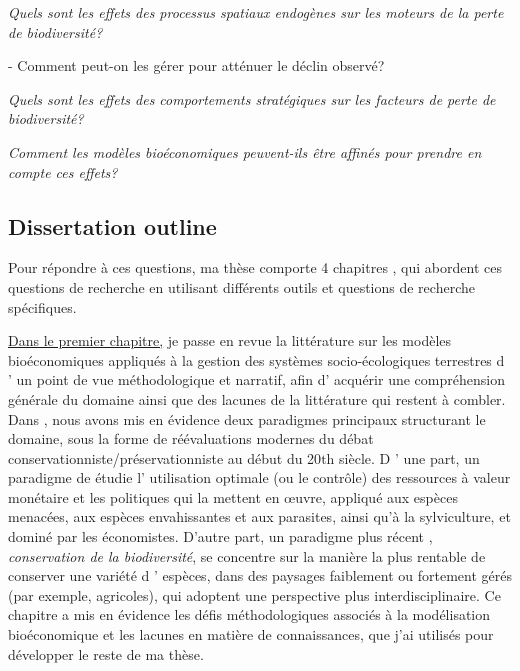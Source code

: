 \begin{displayquote}
\begin{displayquote}
\begin{displayquote}
{{{\begin{displayquote}
\textit{Quels sont les effets des processus spatiaux endogènes sur les moteurs de la perte de biodiversité?}

\N- Comment peut-on les gérer pour atténuer le déclin observé?



  \textit{Quels sont les effets des comportements stratégiques sur les facteurs de perte de biodiversité? }



\textit{Comment les modèles bioéconomiques peuvent-ils être affinés pour prendre en compte ces effets?}
\end{displayquote}

{}
\subsection*{Dissertation outline}


 
Pour répondre à ces questions, ma thèse comporte 4 chapitres , qui abordent ces questions de recherche en utilisant différents outils et questions de recherche spécifiques. 





\hyperref[chapter1]{Dans le premier chapitre,} je passe en revue la littérature sur les modèles bioéconomiques appliqués à la gestion des systèmes socio-écologiques terrestres d ' un point de vue méthodologique et narratif, afin d' acquérir une compréhension générale du domaine ainsi que des lacunes de la littérature qui restent à combler. Dans \citep{jean_bioeconomic_2022}, nous avons mis en évidence deux paradigmes principaux structurant le domaine, sous la forme de réévaluations modernes du débat conservationniste/préservationniste \citep{Banzhaf2019} au début du 20$\mathrm{th}$ siècle. D ' une part, un paradigme de \citep{récolteraisonnée} étudie l' utilisation optimale (ou le contrôle) des ressources à valeur monétaire et les politiques qui la mettent en œuvre, appliqué aux espèces menacées, aux espèces envahissantes et aux parasites, ainsi qu'à la sylviculture, et dominé par les économistes. D'autre part, un paradigme plus récent , \textit{conservation de la biodiversité}, se concentre sur la manière la plus rentable de conserver une variété d ' espèces, dans des paysages faiblement ou fortement gérés (par exemple, agricoles), qui adoptent une perspective plus interdisciplinaire. Ce chapitre a mis en évidence les défis méthodologiques associés à la modélisation bioéconomique et les lacunes en matière de connaissances, que j'ai utilisés pour développer le reste de ma thèse.

}}}
\end{displayquote}
\end{displayquote}
\end{displayquote}
